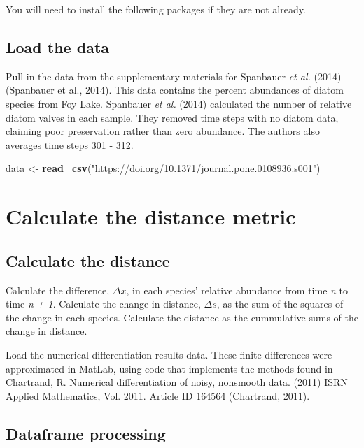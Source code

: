 \documentclass[12pt,twoside,openany]{reedthesis}
\newenvironment{Shaded}{\begin{snugshade}}{\end{snugshade}}
\newcommand{\KeywordTok}[1]{\textcolor[rgb]{0.13,0.29,0.53}{\textbf{#1}}}
\newcommand{\NormalTok}[1]{#1}
\newcommand{\StringTok}[1]{\textcolor[rgb]{0.31,0.60,0.02}{#1}}
\begin{document}
You will need to install the following packages if they are not already.

\hypertarget{load-the-data}{%
\subsection{Load the data}\label{load-the-data}}

Pull in the data from the supplementary materials for Spanbauer \emph{et al.} (2014) (Spanbauer et al., 2014). This data contains the percent abundances of diatom species from Foy Lake. Spanbauer \emph{et al.} (2014) calculated the number of relative diatom valves in each sample. They removed time steps with no diatom data, claiming poor preservation rather than zero abundance. The authors also averages time steps 301 - 312.
\begin{Shaded}
\begin{Highlighting}[]
\NormalTok{data <-}\StringTok{ }\KeywordTok{read_csv}\NormalTok{(}\StringTok{"https://doi.org/10.1371/journal.pone.0108936.s001"}\NormalTok{)}
\end{Highlighting}
\end{Shaded}
\hypertarget{calculate-the-distance-metric}{%
\section{Calculate the distance metric}\label{calculate-the-distance-metric}}

\hypertarget{calculate-the-distance}{%
\subsection{Calculate the distance}\label{calculate-the-distance}}

Calculate the difference, \(\Delta x\), in each species' relative abundance from time \emph{n} to time \emph{n + 1}. Calculate the change in distance, \(\Delta s\), as the sum of the squares of the change in each species. Calculate the distance as the cummulative sums of the change in distance.

Load the numerical differentiation results data. These finite differences were approximated in MatLab, using code that implements the methods found in Chartrand, R. Numerical differentiation of noisy, nonsmooth data. (2011) ISRN Applied Mathematics, Vol. 2011. Article ID 164564 (Chartrand, 2011).

\hypertarget{dataframe-processing}{%
\subsection{Dataframe processing}\label{dataframe-processing}}
\end{document}
